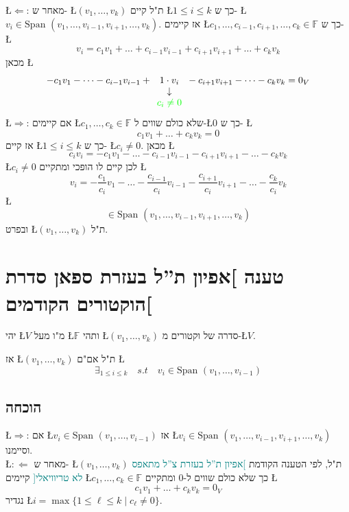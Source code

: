 \documentclass[english,hebrew]{article}
\newcommand{\spn}{\text{Span }}
\begin{document}
\L{$\Leftarrow$}: מאחר ש- \L{$(v_{1},\dots,v_{k})$} ת"ל קיים \L{$1\le i\le k$}
כך ש- \L{$v_{i}\in\spn(v_{1},\dots,v_{i-1},v_{i+1},\dots,v_{k})$}.
אז קיימים \L{$c_{1},\dots,c_{i-1},c_{i+1},\dots,c_{k}\in\mathbb{F}$}
כך ש- \L{%
\[
v_{i}=c_{1}v_{1}+\dots+c_{i-1}v_{i-1}+c_{i+1}v_{i+1}+\dots+c_{k}v_{k}
\]
}%
מכאן \L{%
\[
-c_{1}v_{1}-\dots-c_{i-1}v_{i-1}+\underset{\begin{array}{c}
\downarrow\\
{\color{green}c_{i}\ne0}
\end{array}}{1\cdot v_{i}}-c_{i+1}v_{i+1}-\dots-c_{k}v_{k}=0_{V}
\]
}%
\L{$\Rightarrow$}: אם קיימים \L{$c_{1},\dots,c_{k}\in\mathbb{F}$}
שלא כולם שווים ל-\L{$0$} כך ש- \L{%
\[
c_{1}v_{1}+\dots+c_{k}v_{k}=0
\]
}%
אז קיים \L{$1\le i\le k$} כך ש- \L{$c_{i}\ne0$}. מכאן \L{%
\[
c_{i}v_{i}=-c_{1}v_{1}-\dots-c_{i-1}v_{i-1}-c_{i+1}v_{i+1}-\dots-c_{k}v_{k}
\]
}%
\L{$c_{i}\ne0$} לכן קיים לו הופכי ומתקיים \L{%
\[
v_{i}=-\frac{c_{1}}{c_{i}}v_{1}-\dots-\frac{c_{i-1}}{c_{i}}v_{i-1}-\frac{c_{i+1}}{c_{i}}v_{i+1}-\dots-\frac{c_{k}}{c_{i}}v_{k}
\]
}%
\L{%
\[
\in\spn(v_{1},\dots,v_{i-1},v_{i+1},\dots,v_{k})
\]
}%
ובפרט \L{$(v_{1},\dots,v_{k})$} ת"ל.

\section{טענה {]}אפיון ת\textquotedblright ל בעזרת ספאן סדרת הוקטורים הקודמים{[}}

יהי \L{$V$} מ"ו מעל \L{$\mathbb{F}$} ותהי \L{$(v_{1},\dots,v_{k})$}
סדרה של וקטורים מ-\L{$V$}.

אז \L{$(v_{1},\dots,v_{k})$} ת"ל אם"ם \L{%
\[
\exists_{1\leq i\leq k}\quad s.t\quad v_{i}\in\spn(v_{1},\dots,v_{i-1})
\]
}%

\subsection{הוכחה}

\L{$\Rightarrow$}: אם \L{$v_{i}\in\spn(v_{1},\dots,v_{i-1})$} אז
\L{$v_{i}\in\spn(v_{1},\dots,v_{i-1},v_{i+1},\dots,v_{k})$} וסיימנו.\\

\L{$:\Leftarrow$} מאחר ש- \L{$(v_{1},\dots,v_{k})$} ת"ל, לפי הטענה
הקודמת \textcolor{teal}{{]}אפיון ת\textquotedblright ל בעזרת צ\textquotedblright ל
מתאפס לא טריוויאלי{[}} קיימים \L{$c_{1},\dots,c_{k}\in\mathbb{F}$}
כך שלא כולם שווים ל-0 ומתקיים \L{%
\[
c_{1}v_{1}+\dots+c_{k}v_{k}=0_{V}
\]
}%
נגדיר \L{$i=\max\{1\le\ell\le k\mid c_{\ell}\neq0\}$}.
\end{document}
